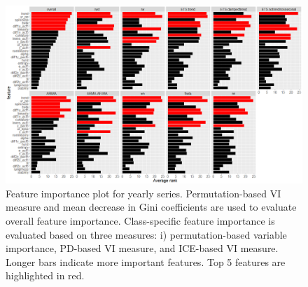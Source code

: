 \documentclass[11pt,a4paper,]{article}
\begin{document}
\begin{figure}
\centering
\includegraphics{figures/viyearly-1.png}
\caption{\label{fig:viyearly}Feature importance plot for yearly series.
Permutation-based VI measure and mean decrease in Gini coefficients are
used to evaluate overall feature importance. Class-specific feature
importance is evaluated based on three measures: i) permutation-based
variable importance, PD-based VI measure, and ICE-based VI measure.
Longer bars indicate more important features. Top 5 features are
highlighted in red.}
\end{figure}

\newpage
\end{document}
